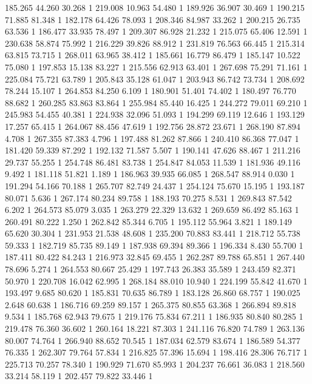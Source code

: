 	185.265	44.260	30.268	1
	219.008	10.963	54.480	1
	189.926	36.907	30.469	1
	190.215	71.885	81.348	1
	182.178	64.426	78.093	1
	208.346	84.987	33.262	1
	200.215	26.735	63.536	1
	186.477	33.935	78.497	1
	209.307	86.928	21.232	1
	215.075	65.406	12.591	1
	230.638	58.874	75.992	1
	216.229	39.826	88.912	1
	231.819	76.563	66.445	1
	215.314	63.815	73.715	1
	268.011	63.965	38.412	1
	185.661	16.779	86.479	1
	185.147	10.522	75.080	1
	197.853	15.138	83.227	1
	215.556	62.913	63.401	1
	267.698	75.291	71.161	1
	225.084	75.721	63.789	1
	205.843	35.128	61.047	1
	203.943	86.742	73.734	1
	208.692	78.244	15.107	1
	264.853	84.250	6.109	1
	180.901	51.401	74.402	1
	180.497	76.770	88.682	1
	260.285	83.863	83.864	1
	255.984	85.440	16.425	1
	244.272	79.011	69.210	1
	245.983	54.455	40.381	1
	224.938	32.096	51.093	1
	194.299	69.119	12.646	1
	193.129	17.257	65.415	1
	264.067	88.456	47.619	1
	192.756	28.872	23.671	1
	268.190	87.894	4.708	1
	267.355	87.383	4.796	1
	197.488	81.262	87.866	1
	240.410	86.368	77.047	1
	181.420	59.339	87.292	1
	192.132	71.587	5.507	1
	190.141	47.626	88.467	1
	211.216	29.737	55.255	1
	254.748	86.481	83.738	1
	254.847	84.053	11.539	1
	181.936	49.116	9.492	1
	181.118	51.821	1.189	1
	186.963	39.935	66.085	1
	268.547	88.914	0.030	1
	191.294	54.166	70.188	1
	265.707	82.749	24.437	1
	254.124	75.670	15.195	1
	193.187	80.071	5.636	1
	267.174	80.234	89.758	1
	188.193	70.275	8.531	1
	269.843	87.542	6.202	1
	264.573	85.079	3.035	1
	263.279	22.329	13.632	1
	269.659	86.492	85.163	1
	260.491	80.222	1.250	1
	262.842	85.344	6.705	1
	195.112	55.964	3.821	1
	189.149	65.620	30.304	1
	231.953	21.538	48.608	1
	235.200	70.883	83.441	1
	218.712	55.738	59.333	1
	182.719	85.735	89.149	1
	187.938	69.394	89.366	1
	196.334	8.430	55.700	1
	187.411	80.422	84.243	1
	216.973	32.845	69.455	1
	262.287	89.788	65.851	1
	267.440	78.696	5.274	1
	264.553	80.667	25.429	1
	197.743	26.383	35.589	1
	243.459	82.371	50.970	1
	220.708	16.042	62.995	1
	268.184	88.010	10.940	1
	224.199	55.842	41.670	1
	193.497	9.685	80.620	1
	185.831	70.635	86.789	1
	183.128	26.860	68.757	1
	190.025	2.648	60.638	1
	186.716	69.259	89.157	1
	265.375	80.855	63.368	1
	266.894	89.818	9.534	1
	185.768	62.943	79.675	1
	219.176	75.834	67.211	1
	186.935	80.840	80.285	1
	219.478	76.360	36.602	1
	260.164	18.221	87.303	1
	241.116	76.820	74.789	1
	263.136	80.007	74.764	1
	266.940	88.652	70.545	1
	187.034	62.579	83.674	1
	186.589	54.377	76.335	1
	262.307	79.764	57.834	1
	216.825	57.396	15.694	1
	198.416	28.306	76.717	1
	225.713	70.257	78.340	1
	190.929	71.670	85.993	1
	204.237	76.661	36.083	1
	218.560	33.214	58.119	1
	202.457	79.822	33.446	1
